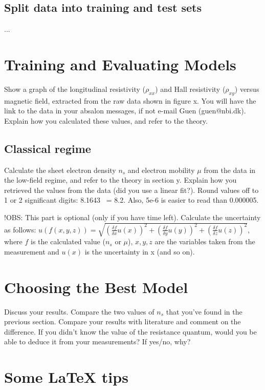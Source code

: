 \documentclass[a4paper]{article}
\begin{document}
\subsection{Split data into training and test sets}
...

\section{Training and Evaluating Models}
Show a graph of the longitudinal resistivity ($\rho_{xx}$) and Hall resistivity ($\rho_{xy}$) versus magnetic field, extracted from the raw data shown in figure x. You will have the link to the data in your absalon messages, if not e-mail Guen (guen@nbi.dk). Explain how you calculated these values, and refer to the theory.

\subsection{Classical regime}
Calculate the sheet electron density $n_{s}$ and electron mobility $\mu$ from the data in the low-field regime, and refer to the theory in section y. Explain how you retrieved the values from the data (did you use a linear fit?).
Round values off to 1 or 2 significant digits: 8.1643 ~= 8.2. Also, 5e-6 is easier to read than 0.000005.

!OBS: This part is optional (only if you have time left).
Calculate the uncertainty as follows: \newline $u(f(x, y, z)) = \sqrt{(\frac{\delta f}{\delta{x}} u(x))^{2} + (\frac{\delta f}{\delta{y}} u(y))^{2} + (\frac{\delta f}{\delta{z}} u(z))^{2}}$, where $f$ is the calculated value ($n_{s}$ or $\mu$), $x, y, z$ are the variables taken from the measurement and $u(x)$ is the uncertainty in x (and so on).

\section{Choosing the Best Model}
Discuss your results. Compare the two values of $n_{s}$ that you've found in the previous section. Compare your results with literature and comment on the difference. If you didn't know the value of the resistance quantum, would you be able to deduce it from your measurements? If yes/no, why?







\newpage
\section{Some LaTeX tips}
\label{sec:latex}
\end{document}
